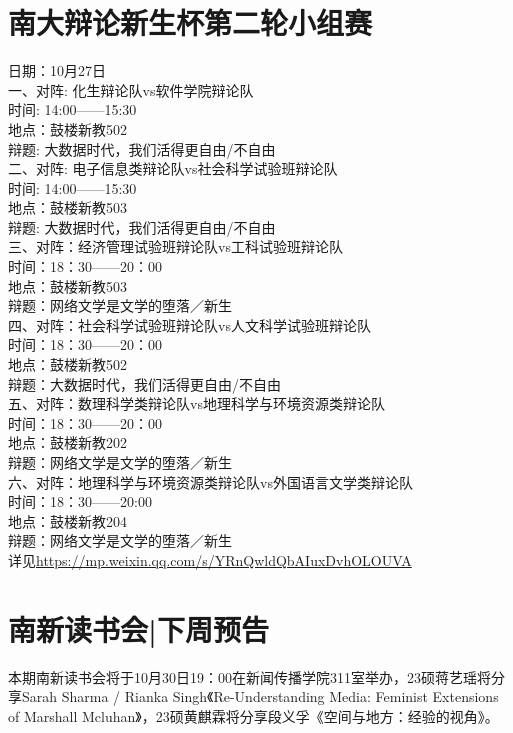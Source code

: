 \documentclass[letterpaper, 12pt]{article}
\begin{document}
\begin{multicols}{2}
\section{南大辩论新生杯第二轮小组赛}
日期：10月27日\\
一、对阵: 化生辩论队vs软件学院辩论队\\
时间: 14:00——15:30 \\
地点：鼓楼新教502\\
辩题: 大数据时代，我们活得更自由/不自由\\
二、对阵: 电子信息类辩论队vs社会科学试验班辩论队\\
时间: 14:00——15:30 \\
地点：鼓楼新教503\\
辩题: 大数据时代，我们活得更自由/不自由\\
三、对阵：经济管理试验班辩论队vs工科试验班辩论队\\
时间：18：30——20：00\\
地点：鼓楼新教503\\
辩题：网络文学是文学的堕落／新生\\
四、对阵：社会科学试验班辩论队vs人文科学试验班辩论队\\
时间：18：30——20：00\\
地点：鼓楼新教502\\
辩题：大数据时代，我们活得更自由/不自由\\
五、对阵：数理科学类辩论队vs地理科学与环境资源类辩论队\\
时间：18：30——20：00\\
地点：鼓楼新教202\\
辩题：网络文学是文学的堕落／新生\\
六、对阵：地理科学与环境资源类辩论队vs外国语言文学类辩论队\\
时间：18：30——20:00\\
地点：鼓楼新教204\\
辩题：网络文学是文学的堕落／新生\\
详见\url{https://mp.weixin.qq.com/s/YRnQwldQbAIuxDvhOLOUVA}
\section{南新读书会|下周预告}
本期南新读书会将于10月30日19：00在新闻传播学院311室举办，23硕蒋艺瑶将分享Sarah Sharma / Rianka Singh《Re-Understanding Media: Feminist Extensions of Marshall Mcluhan》，23硕黄麒霖将分享段义孚《空间与地方：经验的视角》。

\end{multicols}
\end{document}

